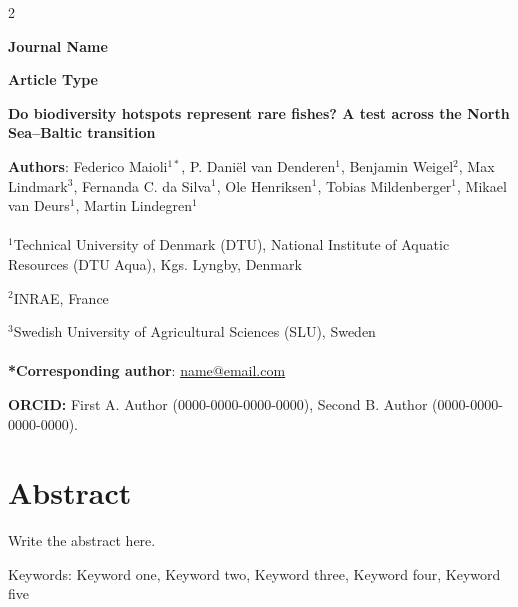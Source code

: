 \begin{spacing}{2}   %

\noindent
\textbf{Journal Name}

\noindent
\textbf{Article Type}   %

\noindent
\textbf{Do biodiversity hotspots represent rare fishes? A test across the North Sea–Baltic transition}

\noindent
\textbf{Authors}: Federico Maioli$^{1*}$, P. Daniël van Denderen$^{1}$, Benjamin Weigel$^{2}$, Max Lindmark$^{3}$, Fernanda C. da Silva$^{1}$,  Ole Henriksen$^{1}$, Tobias Mildenberger$^{1}$, Mikael van Deurs$^{1}$, Martin Lindegren$^{1}$
\\~\\
\noindent
$^1$Technical University of Denmark (DTU), National Institute of Aquatic Resources (DTU Aqua), Kgs. Lyngby, Denmark

\noindent
$^2$INRAE, France

\noindent
$^3$Swedish University of Agricultural Sciences (SLU), Sweden
\\~\\
\noindent
\textbf{*Corresponding author}: \href{mailto:name@email.com}{name@email.com}

\noindent
\textbf{ORCID:} First A. Author (0000-0000-0000-0000), Second B. Author (0000-0000-0000-0000).

\linenumbers
\setcounter{secnumdepth}{0}   %
\clearpage

\section{Abstract}
Write the abstract here.

\vspace*{\fill}
\noindent
Keywords:
Keyword one,
Keyword two,
Keyword three,
Keyword four,
Keyword five\\
\clearpage


\end{spacing}
